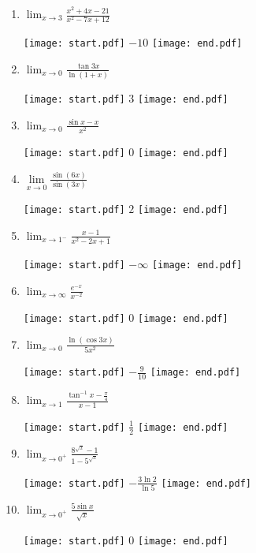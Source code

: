 \documentclass[12pt]{article}
\begin{document}
\begin{enumerate}

\item $\lim_{x \rightarrow 3}{\frac{x^2+4x-21}{x^2-7x+12}}$

\texttt{[image: start.pdf]}
{{$-10$}}
\texttt{[image: end.pdf]}


\item $ \lim_{x \rightarrow 0}{\frac{\tan{3x}}{\ln{(1+x)}}}$

\texttt{[image: start.pdf]}
{{$3$}}
\texttt{[image: end.pdf]}


\item $\lim_{x \rightarrow 0}{\frac{\sin{x}-x}{x^2}}$

\texttt{[image: start.pdf]}
{{$0$}}
\texttt{[image: end.pdf]}


\item $\lim\limits_{x\rightarrow 0} \frac{\sin{(6x)}}{\sin{(3x)}}$ 

\texttt{[image: start.pdf]}
{{$2$}}
\texttt{[image: end.pdf]}


\item $\lim_{x \rightarrow 1^-}{\frac{x-1}{x^2-2x+1}}$

\texttt{[image: start.pdf]}
{{$-\infty$}}
\texttt{[image: end.pdf]}


\item $\lim_{x \rightarrow \infty}{\frac{e^{-x}}{x^{-2}}}$

\texttt{[image: start.pdf]}
{{$0$}}
\texttt{[image: end.pdf]}


\item $\lim_{x \rightarrow 0}{\frac{\ln{(\cos{3x})}}{5x^2}}$

\texttt{[image: start.pdf]}
{{$-\frac{9}{10}$}}
\texttt{[image: end.pdf]}


\item $\lim_{x \rightarrow 1}{\frac{\tan^{-1}{x}-\frac{\pi}{4}}{x-1}}$

\texttt{[image: start.pdf]}
{{$\frac{1}{2}$}}
\texttt{[image: end.pdf]}


\item $\lim_{x \rightarrow 0^{+}}{\frac{8^{\sqrt{x}}-1}{1-5^{\sqrt{x}}}}$

\texttt{[image: start.pdf]}
{{$-\frac{3\ln{2}}{\ln{5}}$}}
\texttt{[image: end.pdf]}


\item $\lim_{x\rightarrow 0^{+}}{\frac{5\sin{x}}{\sqrt{x}}}$

\texttt{[image: start.pdf]}
{{$0$}}
\texttt{[image: end.pdf]}



\end{enumerate}
\end{document}
